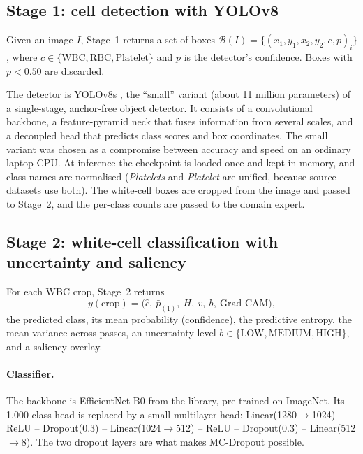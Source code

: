 \subsection{Stage 1: cell detection with YOLOv8}\label{sec:stage1}

Given an image $I$, Stage~1 returns a set of boxes $\mathcal{B}(I) = \{(x_1, y_1, x_2, y_2, c, p)_i\}$, where $c \in \{\text{WBC}, \text{RBC}, \text{Platelet}\}$ and $p$ is the detector's confidence. Boxes with $p < 0.50$ are discarded.

The detector is YOLOv8s \cite{jocher2023yolov8}, the ``small'' variant (about 11 million parameters) of a single-stage, anchor-free object detector. It consists of a convolutional backbone, a feature-pyramid neck that fuses information from several scales, and a decoupled head that predicts class scores and box coordinates. The small variant was chosen as a compromise between accuracy and speed on an ordinary laptop CPU. At inference the checkpoint is loaded once and kept in memory, and class names are normalised (\emph{Platelets} and \emph{Platelet} are unified, because source datasets use both). The white-cell boxes are cropped from the image and passed to Stage~2, and the per-class counts are passed to the domain expert.

\subsection{Stage 2: white-cell classification with uncertainty and saliency}\label{sec:stage2}

For each WBC crop, Stage~2 returns
\begin{equation}
  y(\text{crop}) = \big(\hat{c},\ \bar{p}_{(1)},\ H,\ v,\ b,\ \text{Grad-CAM}\big),
\end{equation}
the predicted class, its mean probability (confidence), the predictive entropy, the mean variance across passes, an uncertainty level $b \in \{\text{LOW}, \text{MEDIUM}, \text{HIGH}\}$, and a saliency overlay.

\paragraph{Classifier.} The backbone is EfficientNet-B0 \cite{tan2019efficientnet} from the  library, pre-trained on ImageNet. Its 1{,}000-class head is replaced by a small multilayer head: Linear(1280$\to$1024) -- ReLU -- Dropout(0.3) -- Linear(1024$\to$512) -- ReLU -- Dropout(0.3) -- Linear(512$\to$8). The two dropout layers are what makes MC-Dropout possible.

